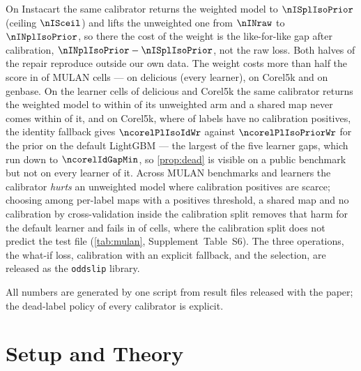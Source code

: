 \documentclass[sigconf,nonacm]{acmart}
\newcommand{\Supp}[1]{Supplement~#1}  %
\begin{document}
\begin{enumerate}[leftmargin=*,nosep]
On Instacart the same calibrator returns the weighted model to $\nISplIsoPrior$ (ceiling $\nISceil$) and lifts the unweighted one from $\nINraw$ to $\nINplIsoPrior$, so there the cost of the weight is the like-for-like gap after calibration, $\nINplIsoPrior-\nISplIsoPrior$, not the raw loss. Both halves of the repair reproduce outside our own data. The weight costs more than half the score in \nnCollapseCells{} of \nnDoseCells{} MULAN cells --- \nnDelCollapseLearners{} on delicious (every learner), \nnCorelCollapseLearners{} on Corel5k and \nnOtherCollapseCells{} on genbase. On the \nnRepairCollapseCells{} learner cells of delicious and Corel5k the same calibrator returns the weighted model to within \nmaxRepairGapCollapse{} of its unweighted arm and a shared map never comes within \nminPooledGapCollapse{} of it, and on Corel5k, where \ncorelDeadCalDose{} of \ncorelL{} labels have no calibration positives, the identity fallback gives $\ncorelPlIsoIdWr$ against $\ncorelPlIsoPriorWr$ for the prior on the default LightGBM --- the largest of the five learner gaps, which run down to $\ncorelIdGapMin$, so \cref{prop:dead} is visible on a public benchmark but not on every learner of it. Across \nnMulan{} MULAN benchmarks and \nnLearners{} learners the calibrator \emph{hurts} an unweighted model where calibration positives are scarce; choosing among per-label maps with a positives threshold, a shared map and no calibration by cross-validation inside the calibration split removes that harm for the default learner and fails in \nnTauSelBelowRaw{} of \nnTauCells{} cells, where the calibration split does not predict the test file (\cref{tab:mulan}, \Supp{Table~S6}). The three operations, the what-if loss, calibration with an explicit fallback, and the selection, are released as the \texttt{oddslip} library.
\end{enumerate}
All numbers are generated by one script from result files released with the paper; the dead-label policy of every calibrator is explicit.

\section{Setup and Theory}
\label{sec:theory}
\end{document}
